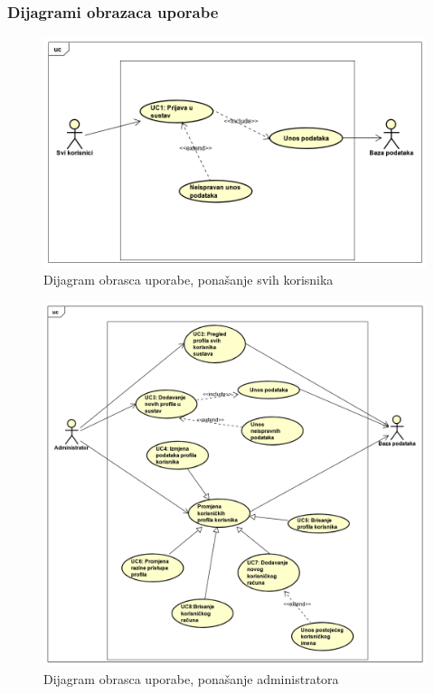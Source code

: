 	\eject
				
					
				\subsubsection{Dijagrami obrazaca uporabe}
					
				\begin{figure}[H]
					\includegraphics[scale=0.6]{slike/UseCase SviKorisnici Marko.png}
					\centering
					\caption{Dijagram obrasca uporabe, ponašanje svih korisnika}
					\label{fig:svi_korisnici}
				\end{figure}
			
		     	\begin{figure}[H]
			     	\includegraphics[scale=0.55]{slike/UseCase Admin Marko.png}
			    	\centering
			    	\caption{Dijagram obrasca uporabe, ponašanje administratora}
			    	\label{fig:administrator}
			    \end{figure}
		
